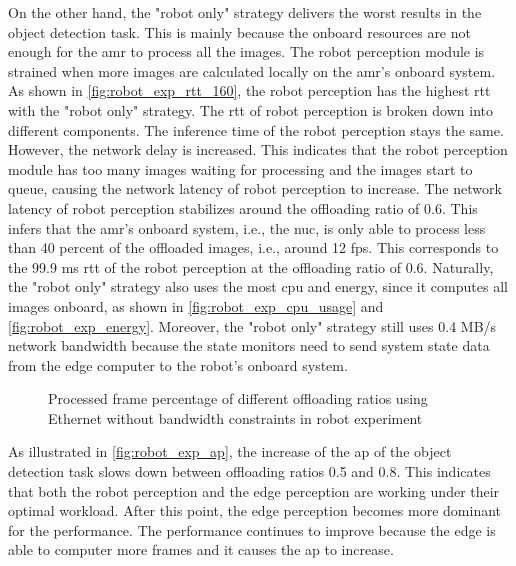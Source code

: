 On the other hand, the "robot only" strategy delivers the worst results in the object detection task. This is mainly because the onboard resources are not enough for the \gls{amr} to process all the images. The robot perception module is strained when more images are calculated locally on the \gls{amr}'s onboard system. As shown in \cref{fig:robot_exp_rtt_160}, the robot perception has the highest \gls{rtt} with the "robot only" strategy. The \gls{rtt} of robot perception is broken down into different components. The inference time of the robot perception stays the same. However, the network delay is increased. This indicates that the robot perception module has too many images waiting for processing and the images start to queue, causing the network latency of robot perception to increase. The network latency of robot perception stabilizes around the offloading ratio of 0.6. This infers that the \gls{amr}'s onboard system, i.e., the \gls{nuc}, is only able to process less than 40 percent of the offloaded images, i.e., around 12 \gls{fps}. This corresponds to the 99.9 ms \gls{rtt} of the robot perception at the offloading ratio of 0.6. Naturally, the "robot only" strategy also uses the most \gls{cpu} and energy, since it computes all images onboard, as shown in \cref{fig:robot_exp_cpu_usage} and \cref{fig:robot_exp_energy}. Moreover, the "robot only" strategy still uses 0.4 MB/s network bandwidth because the state monitors need to send system state data from the edge computer to the robot's onboard system.

\begin{figure}
    \centering
    
    \caption{Processed frame percentage of different offloading ratios using Ethernet without bandwidth constraints in robot experiment}
    \label{fig:robot_exp_processed_frame_percentage_320}
\end{figure}

As illustrated in \cref{fig:robot_exp_ap}, the increase of the \gls{ap} of the object detection task slows down between offloading ratios 0.5 and 0.8. This indicates that both the robot perception and the edge perception are working under their optimal workload. After this point, the edge perception becomes more dominant for the performance. The performance continues to improve because the edge is able to computer more frames and it causes the \gls{ap} to increase. 

